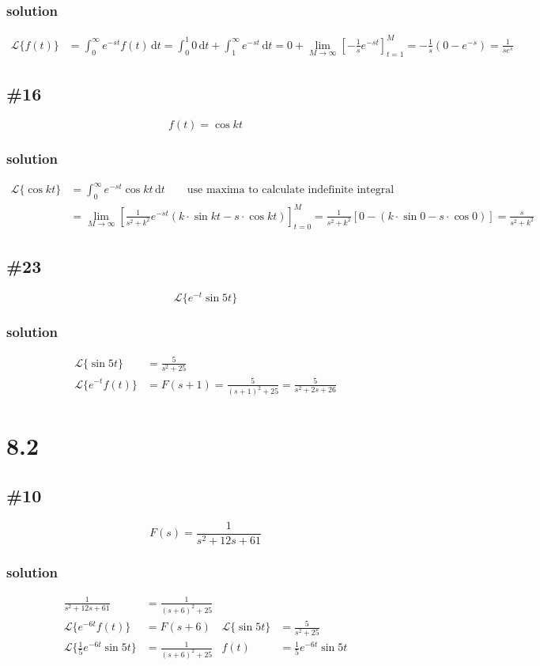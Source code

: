 \documentclass{article}
\begin{document}
\subsubsection*{solution}
\begin{align*}
	\mathcal{L}\{f(t)\}&
	=\int_0^\infty{e^{-st}f(t)\,\mathrm{d}t}
	=\int_0^1{0\,\mathrm{d}t}+\int_1^\infty{e^{-st}\,\mathrm{d}t}
	=0+\lim_{M \to \infty}\left[-\frac{1}{s}e^{-st} \right]_{t=1}^M
	=-\frac{1}{s}(0-e^{-s})
	=\frac{1}{se^s}
\end{align*}

\subsection*{\#16}
\[f(t)=\cos kt\]
\subsubsection*{solution}
\begin{align*}
	\mathcal{L}\{\cos kt\}&=\int^\infty_0{e^{-st}\cos kt\,\mathrm{d}t} \qquad \text{use maxima to calculate indefinite integral}\\
	&=\lim_{M \to \infty}\left[\frac{1}{s^2+k^2}e^{-st}(k\cdot\sin kt-s\cdot\cos kt)\right]_{t=0}^M
	=\frac{1}{s^2+k^2}\left[0-(k\cdot\sin0-s\cdot\cos 0)\right]=\frac{s}{s^2+k^2}
\end{align*}

\subsection*{\#23}
\[\mathcal{L}\{e^{-t}\sin 5t\}\]
\subsubsection*{solution}
\begin{align*}
	\mathcal{L}\{\sin 5t\}&=\frac{5}{s^2+25}\\
	\mathcal{L}\{e^{-t}f(t)\}&=F(s+1)=\frac{5}{(s+1)^2+25}=\frac{5}{s^2+2s+26}
\end{align*}

\section*{8.2}

\subsection*{\#10}
\[F(s)=\frac{1}{s^2+12s+61}\]
\subsubsection*{solution}
\begin{align*}
	\frac{1}{s^2+12s+61}&=\frac{1}{(s+6)^2+25}\\
	\mathcal{L}\{e^{-6t}f(t)\}&=F(s+6) & \mathcal{L}\{\sin 5t\}&=\frac{5}{s^2+25}\\
	\mathcal{L}\{\frac{1}{5}e^{-6t}\sin 5t\}&=\frac{1}{(s+6)^2+25} & f(t)&=\frac{1}{5}e^{-6t}\sin 5t
\end{align*}
\end{document}
